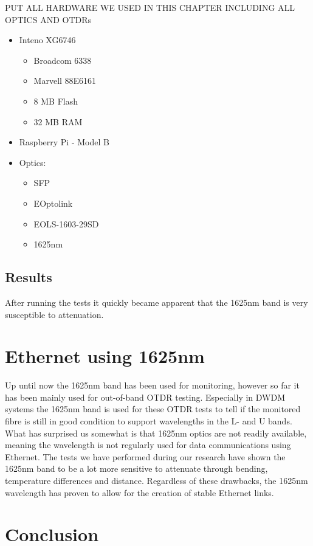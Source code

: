 \documentclass{article}
\begin{document}
PUT ALL HARDWARE WE USED IN THIS CHAPTER INCLUDING ALL OPTICS AND OTDRs
\begin{itemize}
\item Inteno XG6746 \cite{Inteno:XG6746}
\begin{itemize}
\item Broadcom 6338
\item Marvell 88E6161
\item 8 MB Flash
\item 32 MB RAM
\end{itemize}

\item Raspberry Pi - Model B

\item Optics:
\begin{itemize}
\item SFP
\item EOptolink
\item EOLS-1603-29SD
\item 1625nm
\end{itemize}
\end{itemize}

\subsection{Results}
After running the tests it quickly became apparent that the 1625nm band is very susceptible to attenuation.


\section{Ethernet using 1625nm}
Up until now the 1625nm band has been used for monitoring, however so far it has been mainly used for out-of-band OTDR testing.
Especially in DWDM systems the 1625nm band is used for these OTDR tests to tell if the monitored fibre is still in good condition to support wavelengths in the L- and U bands.
What has surprised us somewhat is that 1625nm optics are not readily available, meaning the wavelength is not regularly used for data communications using Ethernet.
The tests we have performed during our research have shown the 1625nm band to be a lot more sensitive to attenuate through bending, temperature differences and distance.
Regardless of these drawbacks, the 1625nm wavelength has proven to allow for the creation of stable Ethernet links.




\newpage
\section{Conclusion}


\end{document}
